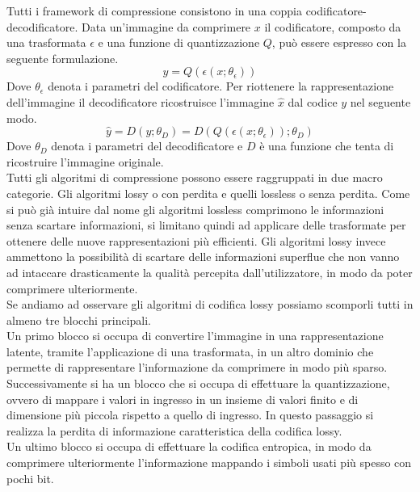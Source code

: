 Tutti i framework di compressione consistono in una coppia codificatore-decodificatore. Data un’immagine da comprimere $x$ il codificatore, composto da una trasformata $\epsilon$ e una funzione di quantizzazione $Q$, può essere espresso con la seguente formulazione.\\
\begin{equation}\label{eq:eqCondificatore}
    y = Q(\epsilon(x;\theta_{\epsilon}))
\end{equation}
Dove $\theta_{\epsilon}$ denota i parametri del codificatore.
Per riottenere la rappresentazione dell’immagine il decodificatore ricostruisce l’immagine $\hat{x}$ dal codice $y$ nel seguente modo.\\
\begin{equation}\label{eq:eqDecodificatore}
    \hat{y} = D(y;\theta_{D}) = D(Q(\epsilon (x;\theta_{\epsilon}));\theta_{D})
\end{equation}
Dove $\theta_{D}$ denota i parametri del decodificatore e $D$ è una funzione che tenta di ricostruire l'immagine originale.\cite{hu2021learning}\\
Tutti gli algoritmi di compressione possono essere raggruppati in due macro categorie. Gli algoritmi lossy o con perdita e quelli lossless o senza perdita. Come si può già intuire dal nome gli algoritmi lossless comprimono le informazioni senza scartare informazioni, si limitano quindi ad applicare delle trasformate per ottenere delle nuove rappresentazioni più efficienti. Gli algoritmi lossy invece ammettono la possibilità di scartare delle informazioni superflue che non vanno ad intaccare drasticamente la qualità percepita dall'utilizzatore, in modo da poter comprimere ulteriormente.\\
Se andiamo ad osservare gli algoritmi di codifica lossy possiamo scomporli tutti in almeno tre blocchi principali.\cite{sadeeq2021image} \\
Un primo blocco si occupa di convertire l’immagine in una rappresentazione latente, tramite l’applicazione di una trasformata, in un altro dominio che permette di rappresentare l’informazione da comprimere in modo più sparso.\\
Successivamente si ha un blocco che si occupa di effettuare la quantizzazione, ovvero di mappare i valori in ingresso in un insieme di valori finito e di dimensione più piccola rispetto a quello di ingresso. In questo passaggio si realizza la perdita di informazione caratteristica della codifica lossy.\\
Un ultimo blocco si occupa di effettuare la codifica entropica, in modo da comprimere ulteriormente l’informazione mappando i simboli usati più spesso con pochi bit.\\
